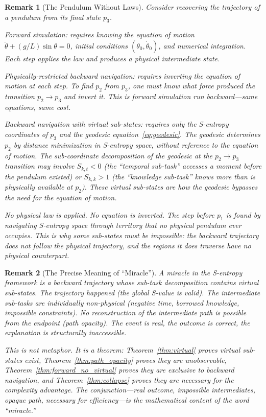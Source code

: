 \documentclass[12pt,twocolumn]{article}
\newtheorem{remark}{Remark}[section]
\begin{document}
\begin{remark}[The Pendulum Without Laws]
\label{rem:pendulum_no_laws}
Consider recovering the trajectory of a pendulum from its final state $p_3$.

\emph{Forward simulation}: requires knowing the equation of motion $\ddot{\theta} + (g/L)\sin\theta = 0$, initial conditions $(\theta_0, \dot{\theta}_0)$, and numerical integration. Each step applies the law and produces a physical intermediate state.

\emph{Physically-restricted backward navigation}: requires inverting the equation of motion at each step. To find $p_2$ from $p_3$, one must know what force produced the transition $p_2 \to p_3$ and invert it. This is forward simulation run backward---same equations, same cost.

\emph{Backward navigation with virtual sub-states}: requires only the S-entropy coordinates of $p_3$ and the geodesic equation~\eqref{eq:geodesic}. The geodesic determines $p_2$ by distance minimization in S-entropy space, without reference to the equation of motion. The sub-coordinate decomposition of the geodesic at the $p_2 \to p_3$ transition may involve $S_{k,t} < 0$ (the ``temporal sub-task'' accesses a moment before the pendulum existed) or $S_{k,k} > 1$ (the ``knowledge sub-task'' knows more than is physically available at $p_2$). These virtual sub-states are how the geodesic bypasses the need for the equation of motion.

No physical law is applied. No equation is inverted. The step before $p_1$ is found by navigating S-entropy space through territory that no physical pendulum ever occupies. This is why some sub-states \emph{must} be impossible: the backward trajectory does not follow the physical trajectory, and the regions it does traverse have no physical counterpart.
\end{remark}

\begin{remark}[The Precise Meaning of ``Miracle'']
\label{rem:miracle}
A \emph{miracle} in the S-entropy framework is a backward trajectory whose sub-task decomposition contains virtual sub-states. The trajectory happened (the global S-value is valid). The intermediate sub-tasks are individually non-physical (negative time, borrowed knowledge, impossible constraints). No reconstruction of the intermediate path is possible from the endpoint (path opacity). The event is real, the outcome is correct, the explanation is structurally inaccessible.

This is not metaphor. It is a theorem: Theorem~\ref{thm:virtual} proves virtual sub-states exist, Theorem~\ref{thm:path_opacity} proves they are unobservable, Theorem~\ref{thm:forward_no_virtual} proves they are exclusive to backward navigation, and Theorem~\ref{thm:collapse} proves they are necessary for the complexity advantage. The conjunction---real outcome, impossible intermediates, opaque path, necessary for efficiency---is the mathematical content of the word ``miracle.''
\end{remark}
\end{document}
